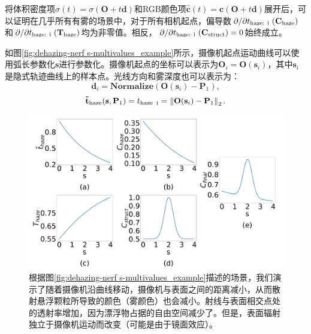 将体积密度项$\hat{\sigma}(t) = \sigma(\mathbf{O} + t\mathbf{d})$和RGB颜色项$\hat{\mathbf{c}}(t) = \mathbf{c}(\mathbf{O} + t\mathbf{d})$展开后，可以证明在几乎所有有雾的场景中，对于所有相机起点，偏导数$\left.\partial\middle/\partial {t}_\text{haze: i}\right.(\mathbf{C_\text{haze}})$和$\left.\partial\middle/\partial {t}_\text{haze: i}\right.(\mathbf{T_\text{haze}})$均为非零值。相反，$\left.\partial\middle/\partial {t}_\text{haze: i}\right.(\mathbf{C_\text{struct}})=0$始终成立。

如图\ref{fig:dehazing-nerf s-multivalues_example}所示，摄像机起点运动曲线可以使用弧长参数化$\mathbf{s}$进行参数化。摄像机起点的坐标可以表示为$\mathbf{O}_i = \mathbf{O}(\mathbf{s}_i)$，其中$\mathbf{s}_i$是隐式轨迹曲线上的样本点。光线方向和雾深度也可以表示为：
\begin{equation}
    \mathbf{d}_i = \mathbf{Normalize}(\mathbf{O}(\mathbf{s}_i) - \mathbf{P}_1), \label{eq:direction}
\end{equation}
\begin{equation}
    \mathbf{\tilde{t}_\text{haze}}(\mathbf{s}, \mathbf{P}_1) = t_\text{haze\: i} = \left\|\mathbf{O}(\mathbf{s}_i) - \mathbf{P}_1\right\|_2.
\end{equation}

\begin{figure}[ht]
    \centering
    \includegraphics[width=\textwidth]{undergraduate-thesis/images/dehazing-nerf/s-multivalues_relation.pdf}
    \caption{根据图\ref{fig:dehazing-nerf s-multivalues_example}描述的场景，我们演示了随着摄像机沿曲线移动，摄像机与表面之间的距离减小，从而散射悬浮颗粒所导致的颜色（雾颜色）也会减小。射线与表面相交点处的透射率增加，因为漂浮物占据的自由空间减少了。但是，表面辐射独立于摄像机运动而改变（可能是由于镜面效应）。}
    \label{fig:dehazing-nerf view-dependency_relation}
\end{figure}

